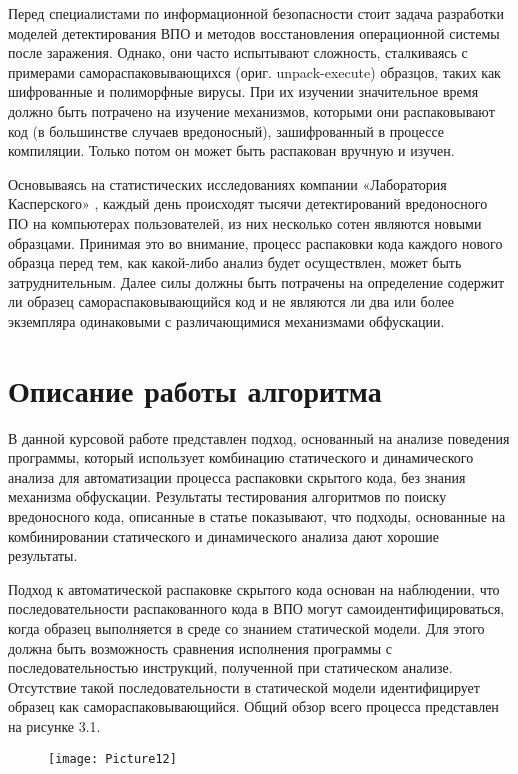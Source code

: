 \documentclass[oneside, final, 14pt]{extreport}
\begin{document}
Перед специалистами по информационной безопасности стоит задача разработки моделей детектирования ВПО и методов восстановления операционной системы после заражения. Однако, они часто испытывают сложность, сталкиваясь с примерами самораспаковывающихся (ориг. unpack-execute) образцов, таких как шифрованные и полиморфные вирусы. При их изучении значительное время должно быть потрачено на изучение механизмов, которыми они распаковывают код (в большинстве случаев вредоносный), зашифрованный в процессе компиляции. Только потом он может быть распакован вручную и изучен. 

Основываясь на статистических исследованиях компании «Лаборатория Касперского» \cite{securelist}, каждый день происходят тысячи детектирований вредоносного ПО на компьютерах пользователей, из них несколько сотен являются новыми образцами. Принимая это во внимание, процесс распаковки кода каждого нового образца перед тем, как какой-либо анализ будет осуществлен, может быть затруднительным. Далее силы должны быть потрачены на определение содержит ли образец  самораспаковывающийся код и не являются ли два или более экземпляра одинаковыми с различающимися механизмами обфускации.

\chapter{Описание работы алгоритма}

В данной курсовой работе представлен подход, основанный на анализе поведения программы, который использует комбинацию статического и динамического анализа для автоматизации процесса распаковки скрытого кода, без знания механизма обфускации. Результаты тестирования алгоритмов по поиску вредоносного кода, описанные в статье \cite{h&s} показывают, что подходы, основанные на комбинировании статического и динамического анализа  дают хорошие результаты.

Подход к автоматической распаковке скрытого кода основан на наблюдении, что последовательности распакованного кода в ВПО могут  самоидентифицироваться, когда образец выполняется в среде со знанием статической модели. Для этого должна быть возможность сравнения исполнения программы с последовательностью инструкций, полученной при статическом анализе. Отсутствие такой последовательности в статической модели идентифицирует образец как самораспаковывающийся. Общий обзор всего процесса представлен на рисунке 3.1.

\begin{figure}[t]
	\centering
    \texttt{[image: Picture12]}
	\caption{}
	\label{truck_figure}
\end{figure}
\end{document}
